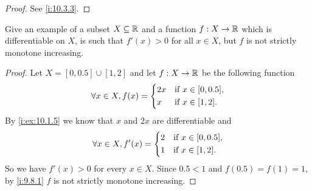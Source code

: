 \begin{proof}
  See \cref{i:10.3.3}.
\end{proof}

\begin{ex}\label{i:ex:10.3.5}
  Give an example of a subset \(X \subseteq \mathbb{R}\) and a function \(f : X \to \mathbb{R}\) which is differentiable on \(X\), is such that \(f'(x) > 0\) for all \(x \in X\), but \(f\) is not strictly monotone increasing.
\end{ex}

\begin{proof}
  Let \(X = [0, 0.5] \cup [1, 2]\) and let \(f : X \to \mathbb{R}\) be the following function
  \[
    \forall x \in X, f(x) = \begin{dcases}
      2x & \text{if } x \in [0, 0.5], \\
      x  & \text{if } x \in [1, 2].
    \end{dcases}
  \]
  By \cref{i:ex:10.1.5} we know that \(x\) and \(2x\) are differentiable and
  \[
    \forall x \in X, f'(x) = \begin{dcases}
      2 & \text{if } x \in [0, 0.5], \\
      1 & \text{if } x \in [1, 2].
    \end{dcases}
  \]
  So we have \(f'(x) > 0\) for every \(x \in X\).
  Since \(0.5 < 1\) and \(f(0.5) = f(1) = 1\), by \cref{i:9.8.1} \(f\) is not strictly monotone increasing.
\end{proof}
